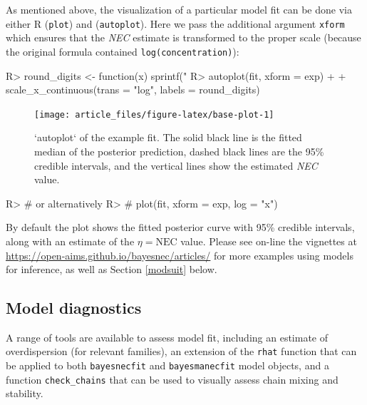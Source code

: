\documentclass[
  shortnames]{jss}
\begin{document}
As mentioned above, the visualization of a particular model fit can be done via either  R (\texttt{plot}) and  (\texttt{autoplot}). Here we pass the additional argument \texttt{xform} which ensures that the \emph{NEC} estimate is transformed to the proper scale (because the original formula contained \texttt{log(concentration)}):

\newpage

\begin{CodeChunk}
\begin{CodeInput}
R> round_digits <- function(x) sprintf("%
R> autoplot(fit, xform = exp) +
+   scale_x_continuous(trans = "log", labels = round_digits)
\end{CodeInput}
\begin{figure}[!ht]

{\centering \texttt{[image: article\_files/figure-latex/base-plot-1]} 

}

\caption{ `autoplot` of the example fit. The solid black line is the fitted median of the posterior prediction, dashed black lines are the 95\% credible intervals, and the vertical lines show the estimated \textit{NEC} value.}\label{fig:base-plot}
\end{figure}
\begin{CodeInput}
R> # or alternatively
R> # plot(fit, xform = exp, log = "x")
\end{CodeInput}
\end{CodeChunk}

By default the plot shows the fitted posterior curve with 95\% credible intervals, along with an estimate of the \(\eta = \text{NEC}\) value. Please see on-line the vignettes at \url{https://open-aims.github.io/bayesnec/articles/} for more examples using  models for inference, as well as Section \ref{modsuit} below.

\hypertarget{model-diagnostics}{%
\subsection{Model diagnostics}\label{model-diagnostics}}

A range of tools are available to assess model fit, including an estimate of overdispersion (for relevant families), an extension of the  \texttt{rhat} function that can be applied to both \texttt{bayesnecfit} and \texttt{bayesmanecfit} model objects, and a function \texttt{check\_chains} that can be used to visually assess chain mixing and stability.
\end{document}
